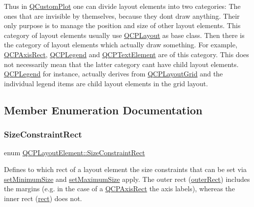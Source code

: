 Thus in \mbox{\hyperlink{class_q_custom_plot}{Q\+Custom\+Plot}} one can divide layout elements into two categories\+: The ones that are invisible by themselves, because they don\textquotesingle{}t draw anything. Their only purpose is to manage the position and size of other layout elements. This category of layout elements usually use \mbox{\hyperlink{class_q_c_p_layout}{Q\+C\+P\+Layout}} as base class. Then there is the category of layout elements which actually draw something. For example, \mbox{\hyperlink{class_q_c_p_axis_rect}{Q\+C\+P\+Axis\+Rect}}, \mbox{\hyperlink{class_q_c_p_legend}{Q\+C\+P\+Legend}} and \mbox{\hyperlink{class_q_c_p_text_element}{Q\+C\+P\+Text\+Element}} are of this category. This does not necessarily mean that the latter category can\textquotesingle{}t have child layout elements. \mbox{\hyperlink{class_q_c_p_legend}{Q\+C\+P\+Legend}} for instance, actually derives from \mbox{\hyperlink{class_q_c_p_layout_grid}{Q\+C\+P\+Layout\+Grid}} and the individual legend items are child layout elements in the grid layout. 

\subsection{Member Enumeration Documentation}
\mbox{\label{class_q_c_p_layout_element_a0afb3e5773529e4bd20e448f81be4d2a}} 
\subsubsection{\texorpdfstring{SizeConstraintRect}{SizeConstraintRect}}
{\footnotesize\ttfamily enum \mbox{\hyperlink{class_q_c_p_layout_element_a0afb3e5773529e4bd20e448f81be4d2a}{Q\+C\+P\+Layout\+Element\+::\+Size\+Constraint\+Rect}}}

Defines to which rect of a layout element the size constraints that can be set via \mbox{\hyperlink{class_q_c_p_layout_element_a5dd29a3c8bc88440c97c06b67be7886b}{set\+Minimum\+Size}} and \mbox{\hyperlink{class_q_c_p_layout_element_a74eb5280a737ab44833d506db65efd95}{set\+Maximum\+Size}} apply. The outer rect (\mbox{\hyperlink{class_q_c_p_layout_element_a2a32a12a6161c9dffbadeb9cc585510c}{outer\+Rect}}) includes the margins (e.\+g. in the case of a \mbox{\hyperlink{class_q_c_p_axis_rect}{Q\+C\+P\+Axis\+Rect}} the axis labels), whereas the inner rect (\mbox{\hyperlink{class_q_c_p_layout_element_a208effccfe2cca4a0eaf9393e60f2dd4}{rect}}) does not.

